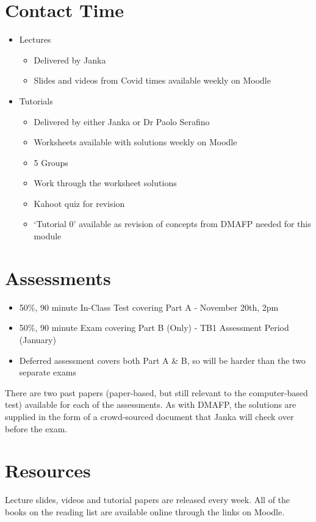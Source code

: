 
\section*{Contact Time}

\begin{itemize}
  \item Lectures
  \begin{itemize}
    \item Delivered by Janka
    \item Slides and videos from Covid times available weekly on Moodle
  \end{itemize}
  \item Tutorials
  \begin{itemize}
    \item Delivered by either Janka or Dr Paolo Serafino
    \item Worksheets available with solutions weekly on Moodle
    \item 5 Groups
    \item Work through the worksheet solutions
    \item Kahoot quiz for revision
    \item `Tutorial 0' available as revision of concepts from DMAFP needed for this module
  \end{itemize}
\end{itemize}

\section*{Assessments}

\begin{itemize}
  \item 50\%, 90 minute In-Class Test covering Part A - November 20th, 2pm
  \item 50\%, 90 minute Exam covering Part B (Only) - TB1 Assessment Period (January)
  \item Deferred assessment covers both Part A \& B, so will be harder than the two separate exams
\end{itemize}

There are two past papers (paper-based, but still relevant to the computer-based test) available for each of the
 assessments. As with DMAFP, the solutions are supplied in the form of a crowd-sourced document that Janka will check
 over before the exam.

\section*{Resources}

Lecture slides, videos and tutorial papers are released every week. All of the books on the reading list are available
 online through the links on Moodle.